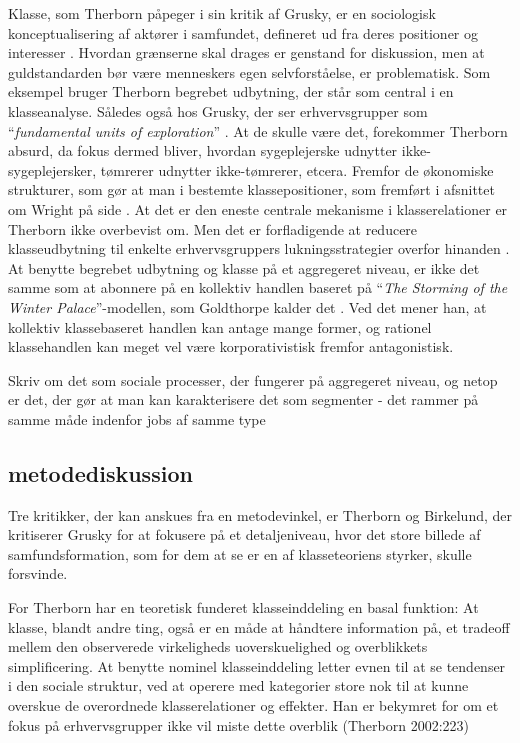 Klasse, som Therborn påpeger i sin kritik af Grusky, er en sociologisk konceptualisering af aktører i samfundet, defineret ud fra deres positioner og interesser \parencite[222]{Therborn2002}. Hvordan grænserne skal drages er genstand for diskussion, men at guldstandarden bør være menneskers egen selvforståelse, er problematisk. Som eksempel bruger Therborn begrebet udbytning, der står som central i en klasseanalyse. Således også hos Grusky, der ser erhvervsgrupper som “\emph{fundamental units of exploration}” \parencite[212]{Grusky2001}. At de skulle være det, forekommer Therborn absurd, da fokus dermed bliver, hvordan sygeplejerske udnytter ikke-sygeplejersker, tømrerer udnytter ikke-tømrerer, etcera. Fremfor de økonomiske strukturer, som gør at man i bestemte klassepositioner, som fremført i afsnittet om Wright på side . At det er den eneste centrale mekanisme i klasserelationer er Therborn ikke overbevist om. Men det er forfladigende at reducere klasseudbytning til enkelte erhvervsgruppers lukningsstrategier overfor hinanden \parencite[222]{Therborn2002}. At benytte begrebet udbytning og klasse på et aggregeret niveau, er ikke det samme som at abonnere på en kollektiv handlen baseret på “\emph{The Storming of the Winter Palace}”-modellen, som Goldthorpe kalder det \parencite[215]{Goldthorpe2002}. Ved det mener han, at kollektiv klassebaseret handlen kan antage mange former, og rationel klassehandlen kan meget vel være korporativistisk fremfor antagonistisk. 

Skriv om det som sociale processer, der fungerer på aggregeret niveau, og netop er det, der gør at man kan karakterisere det som segmenter - det rammer på samme måde indenfor jobs af samme type 


\subsection{metodediskussion \label{2_kritikafgruskymetode}}

Tre kritikker, der kan anskues fra en metodevinkel, er Therborn og Birkelund, der kritiserer Grusky for at fokusere på et detaljeniveau, hvor det store billede af samfundsformation, som for dem at se er en af klasseteoriens styrker, skulle forsvinde. 

For Therborn har en teoretisk funderet klasseinddeling en basal funktion: At klasse, blandt andre ting, også er en måde at håndtere information på, et tradeoff mellem den observerede virkeligheds uoverskuelighed og overblikkets simplificering. At benytte nominel klasseinddeling letter evnen til at se tendenser i den sociale struktur, ved at operere med kategorier store nok til at kunne overskue de overordnede klasserelationer og effekter. Han er bekymret for om et fokus på erhvervsgrupper ikke vil miste dette overblik (Therborn 2002:223)  

